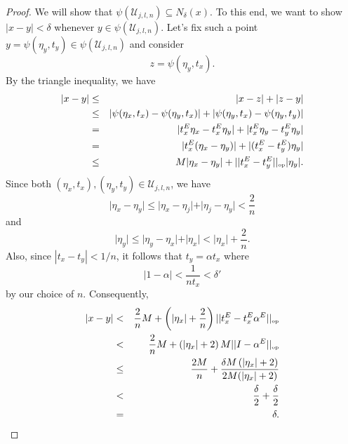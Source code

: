 \documentclass[11pt]{article}
\theoremstyle{theorem}
\begin{document}
\begin{proof}
We will show that $\psi(\mathcal{U}_{j,l,n}) \subseteq N_\delta(x)$. To this end, we want to show $|x-y|<\delta$ whenever $y \in\psi(\mathcal{U}_{j,l,n})$. Let's fix such a point $y=\psi(\eta_y,t_y)\in\psi(\mathcal{U}_{j,l,n})$ and consider 
\begin{equation*}
    z = \psi(\eta_y,t_x).
\end{equation*}
By the triangle inequality, we have
\begin{eqnarray*}
    | x - y | 
    &\leq& |x-z | + |z-y| \\
    &\leq& \vert \psi(\eta_x,t_x) - \psi(\eta_y,t_x) \vert 
    + \vert \psi(\eta_y,t_x) - \psi(\eta_y,t_y) \vert\\
    &=& \vert t_x^E \eta_x - t_x^E \eta_y \vert 
    + \vert t_x^E \eta_y - t_y^E \eta_y \vert\\
    &=& \vert t_x^E (\eta_x - \eta_y) \vert + \vert (t_x^E - t_y^E) \eta_y \vert\\
    &\leq& M\vert \eta_x - \eta_y \vert + \vert\vert{t_x^E - t_y^E}\vert\vert_{\mbox{\tiny{op}}}  \vert \eta_y \vert.
\end{eqnarray*}
Since both $(\eta_x,t_x),(\eta_y,t_y) \in \mathcal{U}_{j,l,n}$, we have
\begin{equation*}
    \vert \eta_x - \eta_y \vert \leq \vert \eta_x - \eta_j \vert + \vert \eta_j - \eta_y \vert < \frac{2}{n}
\end{equation*}
and
\begin{equation*}
    \vert \eta_y \vert \leq \vert \eta_y - \eta_x \vert + \vert \eta_x \vert < \vert \eta_x \vert + \frac{2}{n}.
\end{equation*}
Also, since $|t_x-t_y|<1/n$, it follows that $t_y=\alpha t_x$ where
\begin{equation*}
|1-\alpha|<\frac{1}{nt_x} < \delta'
\end{equation*}
by our choice of $n$. Consequently,
\begin{eqnarray*}
    \vert x - y \vert 
    &< & \frac{2}{n} M+ \left( \vert \eta_x \vert + \frac{2}{n} \right) \vert\vert{t_x^E -   t_x^E \alpha^E}\vert\vert_{\mbox{\tiny{op}}}   \\ 
    &<& \frac{2}{n}M + \left( \vert \eta_x \vert + 2 \right)M\vert\vert I - \alpha^E\vert\vert_{\mbox{\tiny{op}}}  \\
    &\leq&  \frac{2M }{n} +  \frac{\delta M \left( \vert \eta_x \vert + 2\right) }{2M (| \eta_x | + 2)}  \\
    &<& \frac{\delta}{2} + \frac{\delta}{2} \\
    &=& \delta.
\end{eqnarray*}


\end{proof}
\end{document}
